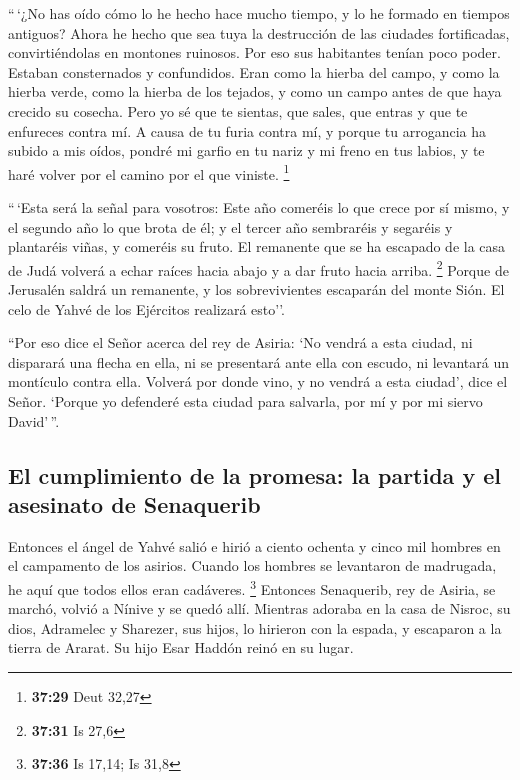  ``\,`¿No has oído cómo lo he hecho hace mucho tiempo, y
lo he formado en tiempos antiguos? Ahora he hecho que sea tuya la
destrucción de las ciudades fortificadas, convirtiéndolas en montones
ruinosos.  Por eso sus habitantes tenían poco poder.
Estaban consternados y confundidos. Eran como la hierba del campo, y
como la hierba verde, como la hierba de los tejados, y como un campo
antes de que haya crecido su cosecha.  Pero yo sé que te
sientas, que sales, que entras y que te enfureces contra mí.
 A causa de tu furia contra mí, y porque tu arrogancia ha
subido a mis oídos, pondré mi garfio en tu nariz y mi freno en tus
labios, y te haré volver por el camino por el que viniste. \footnote{\textbf{37:29}
  Deut 32,27}

 ``\,`Esta será la señal para vosotros: Este año comeréis
lo que crece por sí mismo, y el segundo año lo que brota de él; y el
tercer año sembraréis y segaréis y plantaréis viñas, y comeréis su
fruto.  El remanente que se ha escapado de la casa de
Judá volverá a echar raíces hacia abajo y a dar fruto hacia arriba.
\footnote{\textbf{37:31} Is 27,6}  Porque de Jerusalén
saldrá un remanente, y los sobrevivientes escaparán del monte Sión. El
celo de Yahvé de los Ejércitos realizará esto''.

 ``Por eso dice el Señor acerca del rey de Asiria: `No
vendrá a esta ciudad, ni disparará una flecha en ella, ni se presentará
ante ella con escudo, ni levantará un montículo contra ella.
 Volverá por donde vino, y no vendrá a esta ciudad', dice
el Señor.  `Porque yo defenderé esta ciudad para
salvarla, por mí y por mi siervo David'\,''.

\hypertarget{el-cumplimiento-de-la-promesa-la-partida-y-el-asesinato-de-senaquerib}{%
\subsection{El cumplimiento de la promesa: la partida y el asesinato de
Senaquerib}\label{el-cumplimiento-de-la-promesa-la-partida-y-el-asesinato-de-senaquerib}}

 Entonces el ángel de Yahvé salió e hirió a ciento
ochenta y cinco mil hombres en el campamento de los asirios. Cuando los
hombres se levantaron de madrugada, he aquí que todos ellos eran
cadáveres. \footnote{\textbf{37:36} Is 17,14; Is 31,8} 
Entonces Senaquerib, rey de Asiria, se marchó, volvió a Nínive y se
quedó allí.  Mientras adoraba en la casa de Nisroc, su
dios, Adramelec y Sharezer, sus hijos, lo hirieron con la espada, y
escaparon a la tierra de Ararat. Su hijo Esar Haddón reinó en su lugar.

